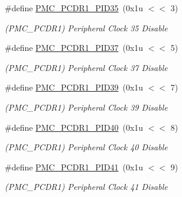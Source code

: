 \begin{DoxyCompactItemize}
\mbox{\label{group__SAMV71__PMC_gab1fd1c1d986befa79913baf342cd3e72}} 
\#define \mbox{\hyperlink{group__SAMV71__PMC_gab1fd1c1d986befa79913baf342cd3e72}{P\+M\+C\+\_\+\+P\+C\+D\+R1\+\_\+\+P\+I\+D35}}~(0x1u $<$$<$ 3)
\begin{DoxyCompactList}\small\item\em (P\+M\+C\+\_\+\+P\+C\+D\+R1) Peripheral Clock 35 Disable \end{DoxyCompactList}\item 
\mbox{\label{group__SAMV71__PMC_ga710106c0e561196af743f9c85af4b78e}} 
\#define \mbox{\hyperlink{group__SAMV71__PMC_ga710106c0e561196af743f9c85af4b78e}{P\+M\+C\+\_\+\+P\+C\+D\+R1\+\_\+\+P\+I\+D37}}~(0x1u $<$$<$ 5)
\begin{DoxyCompactList}\small\item\em (P\+M\+C\+\_\+\+P\+C\+D\+R1) Peripheral Clock 37 Disable \end{DoxyCompactList}\item 
\mbox{\label{group__SAMV71__PMC_gaa857e9321c2268a3cef83b1bb0db20d7}} 
\#define \mbox{\hyperlink{group__SAMV71__PMC_gaa857e9321c2268a3cef83b1bb0db20d7}{P\+M\+C\+\_\+\+P\+C\+D\+R1\+\_\+\+P\+I\+D39}}~(0x1u $<$$<$ 7)
\begin{DoxyCompactList}\small\item\em (P\+M\+C\+\_\+\+P\+C\+D\+R1) Peripheral Clock 39 Disable \end{DoxyCompactList}\item 
\mbox{\label{group__SAMV71__PMC_gadab304c1c9edb8155d57794c47cbd685}} 
\#define \mbox{\hyperlink{group__SAMV71__PMC_gadab304c1c9edb8155d57794c47cbd685}{P\+M\+C\+\_\+\+P\+C\+D\+R1\+\_\+\+P\+I\+D40}}~(0x1u $<$$<$ 8)
\begin{DoxyCompactList}\small\item\em (P\+M\+C\+\_\+\+P\+C\+D\+R1) Peripheral Clock 40 Disable \end{DoxyCompactList}\item 
\mbox{\label{group__SAMV71__PMC_ga52fe068b9d6fd474e5f1707b56c7883a}} 
\#define \mbox{\hyperlink{group__SAMV71__PMC_ga52fe068b9d6fd474e5f1707b56c7883a}{P\+M\+C\+\_\+\+P\+C\+D\+R1\+\_\+\+P\+I\+D41}}~(0x1u $<$$<$ 9)
\begin{DoxyCompactList}\small\item\em (P\+M\+C\+\_\+\+P\+C\+D\+R1) Peripheral Clock 41 Disable \end{DoxyCompactList}\item 
$$
\end{DoxyCompactItemize}
